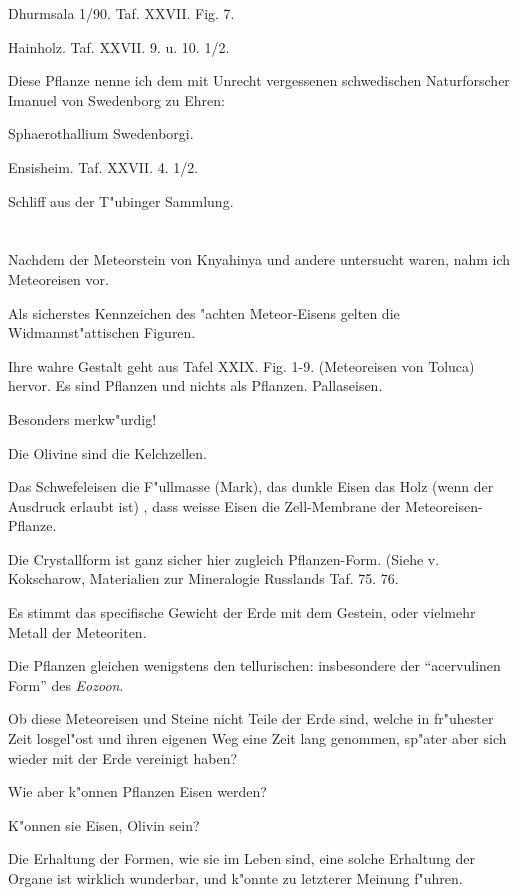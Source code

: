 \documentclass[a4paper, 11pt, oneside, german]{article}
\begin{document}
    Dhurmsala 1/90. Taf. XXVII. Fig. 7.

    Hainholz. Taf. XXVII. 9. u. 10. 1/2.

Diese Pflanze nenne ich dem mit Unrecht vergessenen schwedischen Naturforscher Imanuel von Swedenborg zu Ehren:

Sphaerothallium Swedenborgi.

    Ensisheim. Taf. XXVII. 4. 1/2.

    Schliff aus der T"ubinger Sammlung.
\clearpage
\section{}
\paragraph{}
Nachdem der Meteorstein von Knyahinya und andere untersucht waren, nahm ich Meteoreisen vor.

Als sicherstes Kennzeichen des "achten Meteor-Eisens gelten die Widmannst"attischen Figuren.

Ihre wahre Gestalt geht aus Tafel XXIX. Fig. 1-9. (Meteoreisen von Toluca) hervor. Es sind Pflanzen und nichts als Pflanzen.
Pallaseisen.

Besonders merkw"urdig!

Die Olivine sind die Kelchzellen.

Das Schwefeleisen die F"ullmasse (Mark), das dunkle Eisen das Holz (wenn der Ausdruck erlaubt ist) , dass weisse Eisen die Zell-Membrane der Meteoreisen-Pflanze.

Die Crystallform ist ganz sicher hier zugleich Pflanzen-Form. (Siehe v. Kokscharow, Materialien zur Mineralogie Russlands Taf. 75. 76.

Es stimmt das specifische Gewicht der Erde mit dem Gestein, oder vielmehr Metall der Meteoriten.

Die Pflanzen gleichen wenigstens den tellurischen: insbesondere der "`acervulinen Form"' des \emph{Eozoon}.

Ob diese Meteoreisen und Steine nicht Teile der Erde sind, welche in fr"uhester Zeit losgel"ost und ihren eigenen Weg eine Zeit lang genommen, sp"ater aber sich wieder mit der Erde vereinigt haben?

Wie aber k"onnen Pflanzen Eisen werden?

K"onnen sie Eisen, Olivin sein?

Die Erhaltung der Formen, wie sie im Leben sind, eine solche Erhaltung der Organe ist wirklich wunderbar, und k"onnte zu letzterer Meinung f"uhren.
\end{document}
